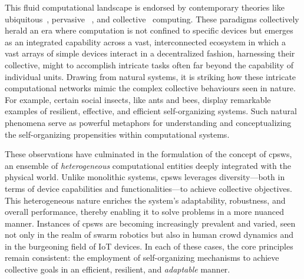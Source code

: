 \begin{refsection}
This fluid computational landscape is endorsed by contemporary theories like  ubiquitous~\cite{ubiquitous}, pervasive
 ~\cite{DBLP:journals/computer/SahaM03}, and collective~\cite{DBLP:journals/computer/Abowd16} computing.
%
These paradigms collectively herald an era where computation 
 is not confined to specific devices but emerges as an integrated capability across a vast, 
 interconnected ecosystem in which a vast arrays of simple devices interact in a decentralized fashion, 
 harnessing their collective, might to accomplish intricate tasks often far beyond the capability of individual units. 
%
Drawing from natural systems, 
 it is striking how these intricate computational networks mimic the complex collective behaviours seen in nature. 
 For example, certain social insects, like ants and bees, display remarkable examples of resilient, effective, and efficient self-organizing systems. 
 Such natural phenomena serve as powerful metaphors for understanding and conceptualizing the self-organizing propensities within computational systems.
 
These observations have culminated in the formulation of the concept of \acp{cpsw}, 
 an ensemble of \emph{heterogeneous} computational entities deeply integrated with the physical world. Unlike monolithic systems, \acp{cpsw} leverages diversity—both in terms of device capabilities and functionalities—to achieve collective objectives. 
 This heterogeneous nature enriches the system's adaptability, robustness, and overall performance, thereby enabling it to solve problems in a more nuanced manner.
%
Instances of \acp{cpsw} are becoming increasingly prevalent and varied, 
 seen not only in the realm of swarm robotics but also in human crowd dynamics and in the burgeoning field of IoT devices. 
 In each of these cases, the core principles remain consistent: the employment of self-organizing mechanisms to achieve collective goals in an efficient, resilient, and \emph{adaptable} manner.


\end{refsection}
